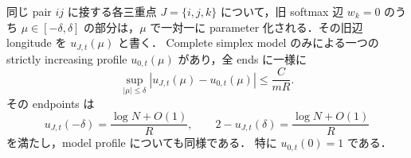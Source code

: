 \begin{lemma}
\label{ke:common-edge-moment-profile}
同じ pair $ij$ に接する各三重点 $J=\{i,j,k\}$ について，旧 softmax 辺
$w_k=0$ のうち $\mu\in[-\delta,\delta]$ の部分は，$\mu$ で一対一に
parameter 化される．その旧辺 longitude を $u_{J,t}(\mu)$ と書く．
Complete simplex model のみによる一つの strictly increasing profile
$u_{0,t}(\mu)$ があり，全 ends に一様に
\begin{equation}\label{ke:eq:common-edge-profile-error}
 \sup_{|\mu|\le\delta}|u_{J,t}(\mu)-u_{0,t}(\mu)|
 \le\frac C{mR}.
\end{equation}
その endpoints は
\[
 u_{J,t}(-\delta)=\frac{\log N+O(1)}R,
 \qquad 2-u_{J,t}(\delta)=\frac{\log N+O(1)}R
\]
を満たし，model profile についても同様である．
特に $u_{0,t}(0)=1$ である．
\end{lemma}


